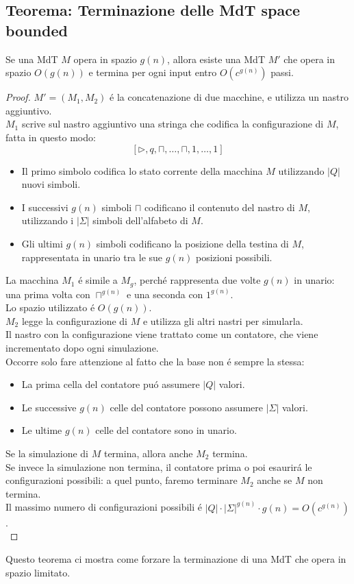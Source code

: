 \subsection{Teorema: Terminazione delle MdT space bounded}
Se una MdT $M$ opera in spazio $g(n)$, allora esiste una MdT $M'$ che opera in spazio $O(g(n))$ e termina per ogni input entro $O(c^{g(n)})$ passi. \\
\begin{proof}
$M' = (M_1, M_2)$ é la concatenazione di due macchine, e utilizza un nastro aggiuntivo. \\
$M_1$ scrive sul nastro aggiuntivo una stringa che codifica la configurazione di $M$, fatta in questo modo: \\
\[[\triangleright, q, \sqcap, \dots, \sqcap, 1, \dots, 1]\]
\begin{itemize}
	\item Il primo simbolo codifica lo stato corrente della macchina $M$ utilizzando $|Q|$ nuovi simboli.
	\item I successivi $g(n)$ simboli $\sqcap$ codificano il contenuto del nastro di $M$, utilizzando i $|\Sigma|$ simboli dell'alfabeto di $M$.
	\item Gli ultimi $g(n)$ simboli codificano la posizione della testina di $M$, rappresentata in unario tra le sue $g(n)$ posizioni possibili. \\
\end{itemize}
La macchina $M_1$ é simile a $M_g$, perché rappresenta due volte $g(n)$ in unario: una prima volta con $\sqcap^{g(n)}$ e una seconda con $1^{g(n)}$. \\
Lo spazio utilizzato é $O(g(n))$. \\

$M_2$ legge la configurazione di $M$ e utilizza gli altri nastri per simularla. \\
Il nastro con la configurazione viene trattato come un contatore, che viene incrementato dopo ogni simulazione. \\
Occorre solo fare attenzione al fatto che la base non é sempre la stessa:
\begin{itemize}
	\item La prima cella del contatore puó assumere $|Q|$ valori.
	\item Le successive $g(n)$ celle del contatore possono assumere $|\Sigma|$ valori.
	\item Le ultime $g(n)$ celle del contatore sono in unario.
\end{itemize}
Se la simulazione di $M$ termina, allora anche $M_2$ termina. \\
Se invece la simulazione non termina, il contatore prima o poi esaurirá le configurazioni possibili: a quel punto, faremo terminare $M_2$ anche se $M$ non termina. \\
Il massimo numero di configurazioni possibili é $|Q| \cdot |\Sigma|^{g(n)} \cdot {g(n)} = O(c^{g(n)})$. \\
\end{proof}

Questo teorema ci mostra come forzare la terminazione di una MdT che opera in spazio limitato. \\